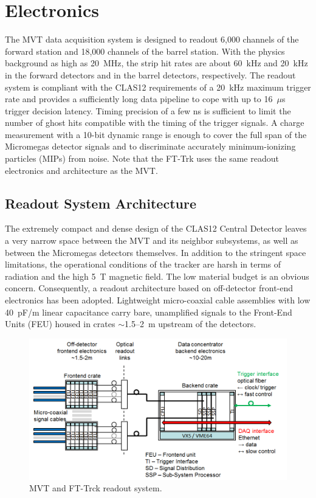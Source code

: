 \section{Electronics}

The MVT data acquisition system is designed to readout 6,000 channels of the forward station and 18,000 channels of the
barrel station. With the physics background as high as 20~MHz, the strip hit rates are about 60~kHz and 20~kHz in the
forward detectors and in the barrel detectors, respectively. The readout system is compliant with the CLAS12 requirements
of a 20~kHz maximum trigger rate and provides a sufficiently long data pipeline to cope with up to 16~$\mu$s trigger decision
latency. Timing precision of a few ns is sufficient to limit the number of ghost hits compatible with the timing of the trigger
signals. A charge measurement with a 10-bit dynamic range is enough to cover the full span of the Micromegas detector signals
and to discriminate accurately minimum-ionizing particles (MIPs) from noise. Note that the FT-Trk uses the same readout electronics and architecture as the MVT.

\subsection{Readout System Architecture}

The extremely compact and dense design of the CLAS12 Central Detector leaves a very narrow space between the MVT and
its neighbor subsystems, as well as between the Micromegas detectors themselves.  In addition to the stringent space limitations, the
operational conditions of the tracker are harsh in terms of radiation and the high 5~T magnetic field. The low material budget
is an obvious concern. Consequently, a readout architecture based on off-detector front-end electronics has been adopted.
Lightweight micro-coaxial cable assemblies with low 40~pF/m linear capacitance carry bare, unamplified signals to the Front-End
Units (FEU) housed in crates $\sim$1.5--2~m upstream of the detectors. 

\begin{figure}[htb]
\begin{center}
 \includegraphics[width=1.6\columnwidth,keepaspectratio]{images/electronics_fig1.png}
\end{center}

 \caption{MVT and FT-Trck readout system.}
 \label{fig:mm-e_1}
\end{figure}

